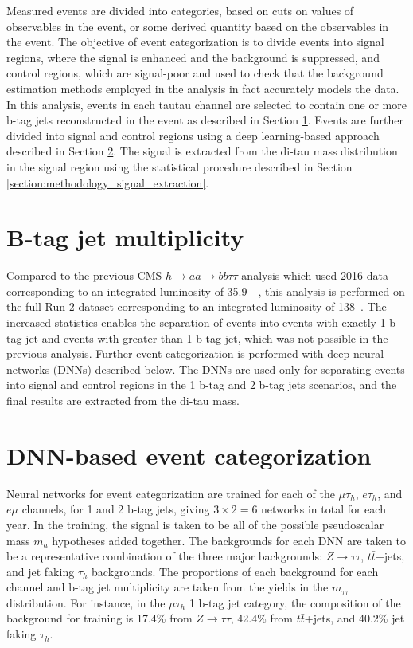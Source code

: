 Measured events are divided into categories, based on cuts on values of observables in the event, or some derived quantity based on the observables in the event. The objective of event categorization is to divide events into signal regions, where the signal is enhanced and the background is suppressed, and control regions, which are signal-poor and used to check that the background estimation methods employed in the analysis in fact accurately models the data. In this analysis, events in each tautau channel are selected to contain one or more b-tag jets reconstructed in the event as described in Section \ref{section:event-categorization-b-tag-jet}. Events are further divided into signal and control regions using a deep learning-based approach described in Section \ref{section:DNN-event-categorization}. The signal is extracted from the di-tau mass distribution in the signal region using the statistical procedure described in Section \ref{section:methodology_signal_extraction}.

\section{B-tag jet multiplicity}
\label{section:event-categorization-b-tag-jet}
Compared to the previous CMS $h \rightarrow aa \rightarrow bb\tau\tau$ analysis which used 2016 data corresponding to an integrated luminosity of 35.9~\fbinv~\cite{CMS-HIG-17-024}, this analysis is performed on the full Run-2 dataset corresponding to an integrated luminosity of 138~\fbinv. The increased statistics enables the separation of events into events with exactly 1 b-tag jet and events with greater than 1 b-tag jet, which was not possible in the previous analysis. Further event categorization is performed with deep neural networks (DNNs) described below. The DNNs are used only for separating events into signal and control regions in the 1 b-tag and 2 b-tag jets scenarios, and the final results are extracted from the di-tau mass.

\section{DNN-based event categorization}
\label{section:DNN-event-categorization}
Neural networks for event categorization are trained for each of the $\mu\tau_{h}$, $e\tau_{h}$, and $e\mu$ channels, for 1 and 2 b-tag jets, giving $3 \times 2 = 6$ networks in total for each year. In the training, the signal is taken to be all of the possible pseudoscalar mass $m_{a}$ hypotheses added together. The backgrounds for each DNN are taken to be a representative combination of the three major backgrounds: $Z \rightarrow \tau\tau$, $t\bar{t}$+jets, and jet faking $\tau_{h}$ backgrounds. The proportions of each background for each channel and b-tag jet multiplicity are taken from the yields in the $m_{\tau\tau}$ distribution. For instance, in the $\mu\tau_{h}$ 1 b-tag jet category, the composition of the background for training is 17.4\% from $Z \rightarrow \tau\tau$, 42.4\% from $t\bar{t}$+jets, and 40.2\% jet faking $\tau_{h}$. 

